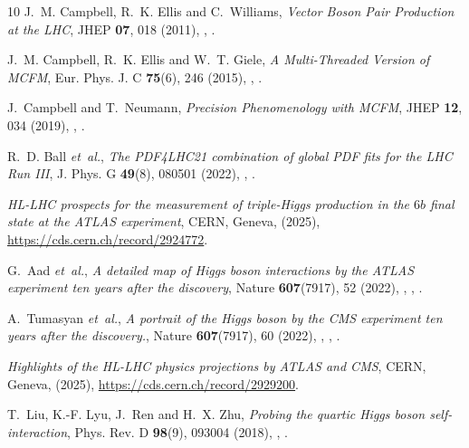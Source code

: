 \documentclass{SciPost}
\begin{document}
\begin{thebibliography}{10}
J.~M. Campbell, R.~K. Ellis and C.~Williams,
\newblock \emph{{Vector Boson Pair Production at the LHC}},
\newblock JHEP \textbf{07}, 018 (2011),
\newblock {},
\newblock {}.

J.~M. Campbell, R.~K. Ellis and W.~T. Giele,
\newblock \emph{{A Multi-Threaded Version of MCFM}},
\newblock Eur. Phys. J. C \textbf{75}(6), 246 (2015),
\newblock {},
\newblock {}.

J.~Campbell and T.~Neumann,
\newblock \emph{{Precision Phenomenology with MCFM}},
\newblock JHEP \textbf{12}, 034 (2019),
\newblock {},
\newblock {}.

R.~D. Ball \emph{et~al.},
\newblock \emph{{The PDF4LHC21 combination of global PDF fits for the LHC Run III}},
\newblock J. Phys. G \textbf{49}(8), 080501 (2022),
\newblock {},
\newblock {}.

\emph{{HL-LHC prospects for the measurement of triple-Higgs production in the $6b$ final state at the ATLAS experiment}},
\newblock CERN, Geneva, (2025),
\newblock \href{https://cds.cern.ch/record/2924772}{https://cds.cern.ch/record/2924772}.

G.~Aad \emph{et~al.},
\newblock \emph{{A detailed map of Higgs boson interactions by the ATLAS experiment ten years after the discovery}},
\newblock Nature \textbf{607}(7917), 52 (2022),
\newblock {},
,
\newblock {}.

A.~Tumasyan \emph{et~al.},
\newblock \emph{{A portrait of the Higgs boson by the CMS experiment ten years after the discovery.}},
\newblock Nature \textbf{607}(7917), 60 (2022),
\newblock {},
,
\newblock {}.

\emph{{Highlights of the HL-LHC physics projections by ATLAS and CMS}},
\newblock CERN, Geneva, (2025),
\newblock \href{https://cds.cern.ch/record/2929200}{https://cds.cern.ch/record/2929200}.

T.~Liu, K.-F. Lyu, J.~Ren and H.~X. Zhu,
\newblock \emph{{Probing the quartic Higgs boson self-interaction}},
\newblock Phys. Rev. D \textbf{98}(9), 093004 (2018),
\newblock {},
\newblock {}.


\end{thebibliography}
\end{document}

